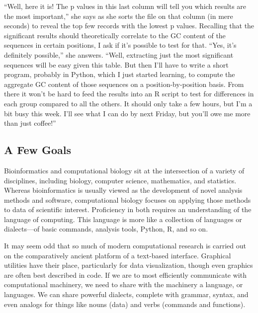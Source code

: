 \documentclass[
]{memoir}
\begin{document}
\enquote{Well, here it is! The p values in this last column will tell you which results are the most important,} she says as she sorts the file on that column (in mere seconds) to reveal the top few records with the lowest p values. Recalling that the significant results should theoretically correlate to the GC content of the sequences in certain positions, I ask if it's possible to test for that. \enquote{Yes, it's definitely possible,} she answers. \enquote{Well, extracting just the most significant sequences will be easy given this table. But then I'll have to write a short program, probably in Python, which I just started learning, to compute the aggregate GC content of those sequences on a position-by-position basis. From there it won't be hard to feed the results into an R script to test for differences in each group compared to all the others. It should only take a few hours, but I'm a bit busy this week. I'll see what I can do by next Friday, but you'll owe me more than just coffee!}

\hypertarget{a-few-goals}{%
\subsection*{A Few Goals}\label{a-few-goals}}

Bioinformatics and computational biology sit at the intersection of a variety of disciplines, including biology, computer science, mathematics, and statistics. Whereas bioinformatics is usually viewed as the development of novel analysis methods and software, computational biology focuses on applying those methods to data of scientific interest. Proficiency in both requires an understanding of the language of computing. This language is more like a collection of languages or dialects---of basic commands, analysis tools, Python, R, and so on.

It may seem odd that so much of modern computational research is carried out on the comparatively ancient platform of a text-based interface. Graphical utilities have their place, particularly for data visualization, though even graphics are often best described in code. If we are to most efficiently communicate with computational machinery, we need to share with the machinery a language, or languages. We can share powerful dialects, complete with grammar, syntax, and even analogs for things like nouns (data) and verbs (commands and functions).
\end{document}
